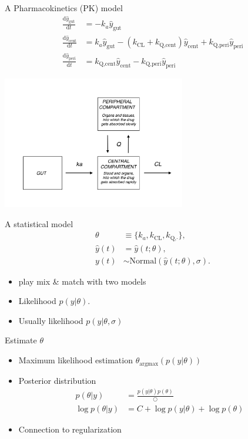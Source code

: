 \documentclass[bigger]{beamer}
\begin{document}
\begin{frame}[label={sec:org2168790}]{A Pharmacokinetics (PK) model}
\begin{align*}
  \frac{\mathrm d \hat{y}_\mathrm{gut}}{\mathrm d t} & = - k_a \hat{y}_\mathrm{gut} \\
  \frac{\mathrm d \hat{y}_\mathrm{cent}}{\mathrm d t} & = k_a \hat{y}_\mathrm{gut} -\left (k_{\text{CL}} + k_{\text{Q,cent}} \right) \hat{y}_\mathrm{cent} + k_{\text{Q,peri}} \hat{y}_\mathrm{peri} \\
  \frac{\mathrm d \hat{y}_\mathrm{peri}}{\mathrm d t} & = k_{\text{Q,cent}} \hat{y}_\mathrm{cent} - k_{\text{Q,peri}} \hat{y}_\mathrm{peri}
\end{align*}

\begin{center}
\includegraphics[width=0.6\textwidth]{./figure/TwoCptNice.png}
\end{center}
\end{frame}

\begin{frame}[label={sec:org1397c4e}]{A statistical model}
\begin{align*}
\theta & \equiv \{k_a, k_{\text{CL}}, k_{\text{Q,}\cdot}\},\\
\hat{y}(t) & = \hat{y}(t;\theta),\\
y(t) &\sim \text{Normal}(\hat{y}(t;\theta), \sigma).
\end{align*}

\begin{itemize}
\item play mix \& match with two models
\item Likelihood \(p(y | \theta)\).
\item Usually likelihood \(p(y | \theta, \sigma)\)
\end{itemize}
\end{frame}

\begin{frame}[label={sec:org80a232c}]{Estimate \(\theta\)}
\begin{itemize}
\item Maximum likelihood estimation
\(\theta_{\text{argmax}}(p(y|\theta))\)
\item Posterior distribution
\begin{align*}
  p(\theta | y) &= \frac{p(y|\theta)p(\theta)}{\bigcirc}\\
  \log{p(\theta|y)} &= C + \log{p(y | \theta)} + \log{p(\theta)}
\end{align*}
\item Connection to regularization
\end{itemize}
\end{frame}
\end{document}
